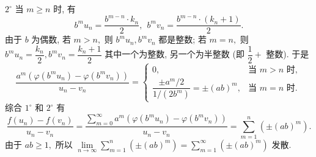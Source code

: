 \begin{solution}
\begin{enumerate}
$2^{\circ}$ 当 $m \geqslant n$ 时, 有
\begin{equation*}
b^m u_n = \dfrac{b^{m-n} \cdot k_n}{2}, ~~ b^m v_n = \dfrac{b^{m-n} \cdot (k_n+1)}{2}.
\end{equation*}
由于 $b$ 为偶数, 若 $m > n,$ 则 $b^m u_n, b^m v_n$ 都是整数;
若 $m = n,$ 则 $b^m u_n = \dfrac{k_n}{2}, b^m v_n = \dfrac{k_n + 1}{2}$ 其中一个为整数,
另一个为半整数 (即 $\dfrac{1}{2} +$ 整数). 于是
\begin{equation*}
\dfrac{a^m (\varphi(b^m u_n) - \varphi(b^m v_n))}{u_n - v_n}
= \begin{cases}
    0, & \text{当 } m > n \text{ 时}, \\
    \dfrac{\pm a^m / 2}{1 / (2 b^{m})} = \pm (ab)^m, & \text{当 } m = n \text{ 时}.
\end{cases}
\end{equation*}
综合 $1^{\circ}$ 和 $2^{\circ}$ 有
\begin{equation*}
\dfrac{f(u_n) - f(v_n)}{u_n - v_n}
= \dfrac{\sum\limits_{m=0}^{\infty} a^m (\varphi(b^m u_n) - \varphi(b^m v_n))}{u_n - v_n}
= \sum\limits_{m=1}^n \left( \pm (ab)^m \right).
\end{equation*}
由于 $ab \geqslant 1,$ 所以 $\displaystyle \lim\limits_{n\to\infty} \sum\limits_{m=1}^n \left( \pm (ab)^m \right) = \sum\limits_{m=1}^{\infty} \left( \pm (ab)^m \right)$ 发散.
\end{enumerate}
\end{solution}



